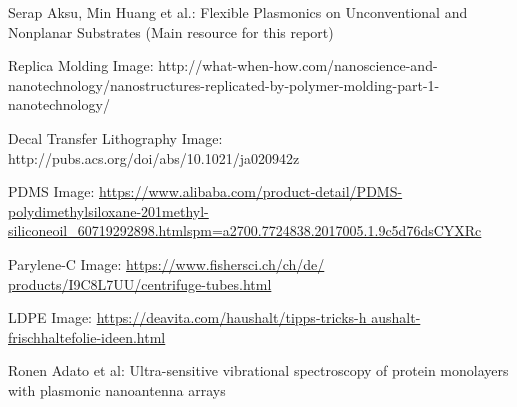 \documentclass[journal, a4paper]{IEEEtran}
\begin{document}
\begin{thebibliography}{5}

Serap Aksu, Min Huang et al.: Flexible Plasmonics on Unconventional and Nonplanar Substrates (Main resource for this report)

Replica Molding Image: http://what-when-how.com/nanoscience-and-nanotechnology/nanostructures-replicated-by-polymer-molding-part-1-nanotechnology/

Decal Transfer Lithography Image: http://pubs.acs.org/doi/abs/10.1021/ja020942z

PDMS Image: \url{https://www.alibaba.com/product-detail/PDMS-polydimethylsiloxane-201methyl-siliconeoil_60719292898.htmlspm=a2700.7724838.2017005.1.9c5d76dsCYXRc}

Parylene-C Image: \url{https://www.fishersci.ch/ch/de/ products/I9C8L7UU/centrifuge-tubes.html}

LDPE Image: \url{https://deavita.com/haushalt/tipps-tricks-h aushalt-frischhaltefolie-ideen.html}

Ronen Adato et al: Ultra-sensitive vibrational spectroscopy of protein monolayers with plasmonic nanoantenna arrays 


\end{thebibliography}

\end{document}
